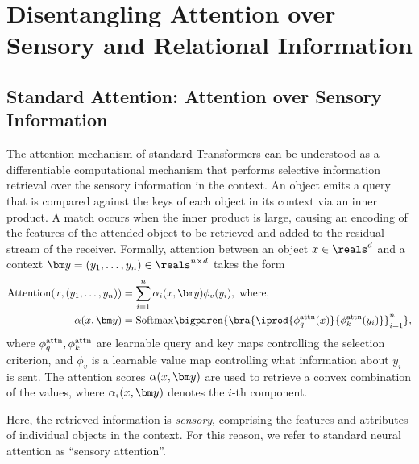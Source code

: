 \section{Disentangling Attention over Sensory and Relational Information}

\subsection{Standard Attention: Attention over Sensory Information}


The attention mechanism of standard Transformers can be understood as a differentiable computational mechanism that performs selective information retrieval over the sensory information in the context.
An object emits a query that is compared against the keys of each object in its context via an inner product. A match occurs when the inner product is large, causing an encoding of the features of the attended object to be retrieved and added to the residual stream of the receiver. Formally, attention between an object $x \in \reals^d$ and a context $\y = \ys \in \reals^{n \times d}$ takes the form
\begin{equation}\label{eq:self_attn}
  \begin{split}
    \Attn(x, \ys) &= \sum_{i=1}^{n} \alpha_i(x, \y) \phi_v(y_i), \ \text{where}, \\
    \alpha(x, \y) &= \Softmax\bigparen{\bra{\iprod{\phiqattn(x)}{\phikattn(y_i)}}_{i=1}^{n}},
  \end{split}
\end{equation}
where $\phi_q^{\mathrm{attn}},\phi_k^{\mathrm{attn}}$ are learnable query and key maps controlling the selection criterion, and $\phi_v$ is a learnable value map controlling what information about $y_i$ is sent. The attention scores $\alpha(x, \y)$ are used to retrieve a convex combination of the values, where $\alpha_i(x, \y)$ denotes the $i$-th component.

Here, the retrieved information is \textit{sensory}, comprising the features and attributes of individual objects in the context. For this reason, we refer to standard neural attention as ``sensory attention''.



